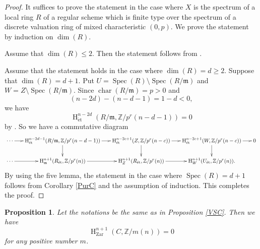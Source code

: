 \documentclass{article}
\newtheorem{prop}[thm]{\indent \sc Proposition}
\newcommand{\spec}{\operatorname{Spec}}
\newcommand{\et}{\mathrm{\acute{e}t}}
\newcommand{\Zar}{\mathrm{Zar}}
\newcommand{\HO}{\operatorname{H}}
\begin{document}
%
\begin{proof}\upshape
It suffices to prove the statement in the case where 
$X$ is the spectrum of a local ring $R$ of a regular scheme
which is finite type over the spectrum of a discrete valuation ring
of mixed characteristic $(0, p)$. We prove the statement by induction on 
$\operatorname{dim}(R)$.

Assume that $\operatorname{dim}(R)\leq 2$.
Then the statement follows from \cite[p.33, Proposition 2.1]{SM}.

Assume that the statement holds 
in the case where $\operatorname{dim}(R)=d\geq 2$.
Suppose that $\operatorname{dim}(R)=d+1$. 
Put $U=\spec(R)\setminus \spec(R/\mathfrak{m})$
and
$W=Z\setminus\spec(R/\mathfrak{m})$.
Since 
$\operatorname{char}(R/\mathfrak{m})=p>0$
and
%
\begin{equation*}
(n-2d)
-
(n-d-1)
=1-d<0,
\end{equation*}
we have
%
\begin{equation*}
\HO^{n-2d}_{\et}\left(
R/\mathfrak{m},\mathbb{Z}/p^{r}(n-d-1)
\right)
=0
\end{equation*}
%
by \cite[Theorem 8.5]{Ge-L}. So we have a commutative diagram
%
\scriptsize
\begin{equation*}
\xymatrix@C=16pt@R=20pt{
\cdots\ar[r]
&
\HO^{n-2d-1}_{\et}
(
R/\mathfrak{m},
\mathbb{Z}/p^{r}(n-d-1)
)
\ar[r]\ar[d]
&
\HO^{n-2c+1}_{\et}
(
Z,
\mathbb{Z}/p^{r}(n-c)
)
\ar[r]\ar[d]
&
\HO^{n-2c+1}_{\et}
(
W,
\mathbb{Z}/p^{r}(n-c)
)
\ar[r]\ar[d]
&
0  \\
\cdots\ar[r]
&
\HO_{\mathfrak{m}}^{n+1}(
R_{\et},
\mathbb{Z}/p^{r}(n)
)
\ar[r]
&
\HO^{n+1}_{Z}(
R_{\et},
\mathbb{Z}/p^{r}(n)
)
\ar[r]
&
\HO^{n+1}_{W}(
U_{\et},
\mathbb{Z}/p^{r}(n)
).
}    
\end{equation*}
\normalsize
%
By using the five lemma, 
the statement in the case where $\spec(R)=d+1$
follows from Corollary \ref{PurC} and the assumption of induction. 
This completes the proof.
\end{proof}
%


%
\begin{prop}\upshape\label{VaniMtM1}
Let the notations be the same as in Proposition \ref{VSC}. Then we have
%
\begin{equation*}
\HO^{n+1}_{\Zar}(
C,
\mathbb{Z}/m(n)
)    
=0
\end{equation*}
%
for any positive number $m$.
\end{prop}
%
\end{document}
